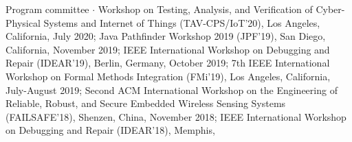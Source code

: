 \documentclass[ComputerScience]{vita}
\begin{document}
\begin{vita}
\begin{Panel and Committee Service}
\item Program committee $\cdot$  Workshop on Testing, Analysis, and Verification of Cyber-Physical Systems and Internet of Things (TAV-CPS/IoT'20), Los Angeles, California, July 2020; 
Java Pathfinder Workshop 2019 (JPF'19), San Diego, California,
November 2019; IEEE
  International Workshop on Debugging and Repair (IDEAR'19), Berlin,
  Germany, October 2019; 
7th IEEE International Workshop on
  Formal Methods Integration (FMi'19), Los Angeles, California,
  July-August 2019; 
  Second ACM International Workshop on
  the Engineering of Reliable, Robust, and Secure Embedded Wireless
  Sensing Systems (FAILSAFE'18), Shenzen, China, November 2018; IEEE
  International Workshop on Debugging and Repair (IDEAR'18), Memphis,

\end{Panel and Committee Service}
\end{vita}
\end{document}
